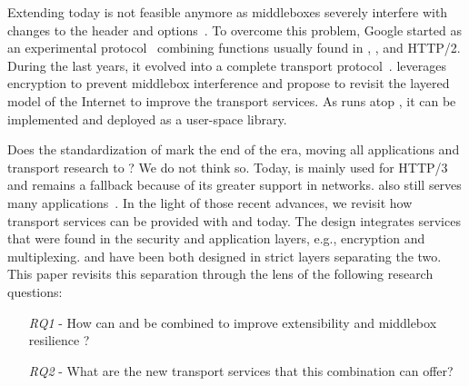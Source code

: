 Extending \tcp today is not feasible anymore as middleboxes severely interfere
with changes to the \tcp header and
options~\cite{medina2004measuring,honda2011still,edeline2019bottom}.
To overcome this problem, Google started \quic as an experimental
protocol~\cite{roskind2013quic,langley2017quic} combining functions usually
found in \tcp, \tls, and HTTP/2. During the last years, it
evolved into a complete transport protocol~\cite{rfc9000}.
\quic leverages encryption to prevent middlebox interference and propose to
revisit the layered model of the Internet to improve the transport services.
As \quic runs atop \udp, it can be implemented and deployed as a user-space library.

Does the standardization of \quic mark the end of the \tcp era, moving
all applications and transport research to \quic?  We do not think
so. Today, \quic is mainly used for HTTP/3~\cite{http3} and \tcp remains a
fallback because of its greater support in networks. \tcp also still serves many  applications~\cite{covid19,fiveyears}.
%
In the light of those recent advances, we revisit how transport services can be
provided with \tcp and \tls today. The \quic design integrates services
that were found in the security and application layers, e.g., encryption and multiplexing.
\tcp and \tls have been both designed in strict layers separating the two.
This paper revisits this separation through the lens of the following research questions:

\begin{itemize}
	\item[{\small{\textit{RQ1}}} -] How can \tcp and \tls be
	combined to improve extensibility and middlebox resilience ?
	\item[{\small{\textit{RQ2}}} -] What are the new transport services that 
	this combination can offer?
\end{itemize}

